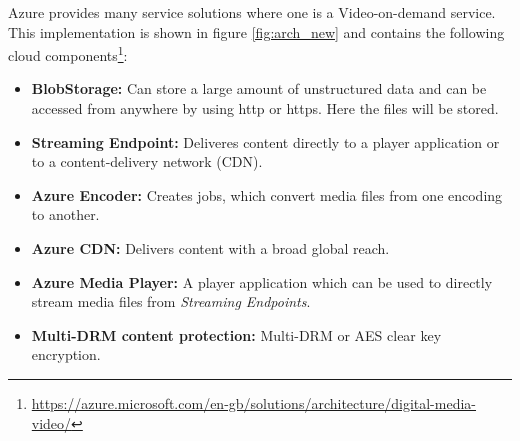 Azure provides many service solutions where one is a Video-on-demand service. This implementation is shown in figure \ref{fig:arch_new} and contains the following cloud components\footnote{\url{https://azure.microsoft.com/en-gb/solutions/architecture/digital-media-video/}}:
\begin{itemize}
    \item \textbf{BlobStorage:} Can store a large amount of unstructured data and can be accessed from anywhere by using http or https. Here the files will be stored.
    \item \textbf{Streaming Endpoint:} Deliveres content directly to a player application or to a content-delivery network (CDN).
    \item \textbf{Azure Encoder:} Creates jobs, which convert media files from one encoding to another.
    \item \textbf{Azure CDN:} Delivers content with a broad global reach.
    \item \textbf{Azure Media Player:} A player application which can be used to directly stream media files from \textit{Streaming Endpoints}.
    \item \textbf{Multi-DRM content protection:} Multi-DRM or AES clear key encryption.
\end{itemize}